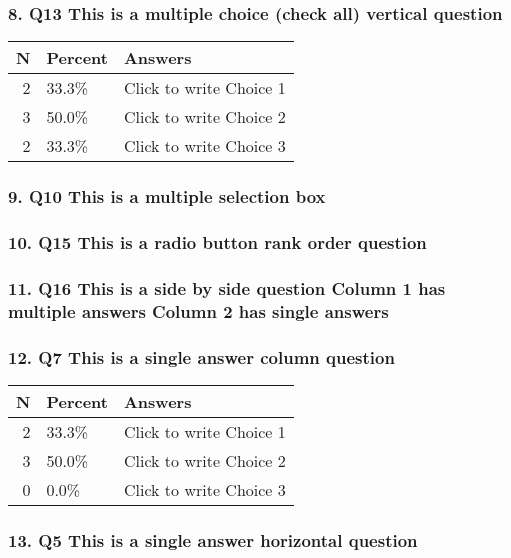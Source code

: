 \documentclass{article}\usepackage[]{graphicx}\usepackage[]{color}
\begin{document}
\hfill \break \hfill \break
\subsubsection*{8. Q13
This is a multiple choice (check all) vertical question}

\begin{tabular}{r|l|l}
\hline
N & Percent & Answers\\
\hline
2 & 33.3\% & Click to write Choice 1\\
\hline
3 & 50.0\% & Click to write Choice 2\\
\hline
2 & 33.3\% & Click to write Choice 3\\
\hline
\end{tabular}


\hfill \break \hfill \break
\subsubsection*{9. Q10
This is a multiple selection box}

\hfill \break \hfill \break
\subsubsection*{10. Q15
This is a radio button rank order question}

\hfill \break \hfill \break
\subsubsection*{11. Q16
This is a side by side question Column 1 has multiple answers Column 2 has single answers}

\hfill \break \hfill \break
\subsubsection*{12. Q7
This is a single answer column question}

\begin{tabular}{r|l|l}
\hline
N & Percent & Answers\\
\hline
2 & 33.3\% & Click to write Choice 1\\
\hline
3 & 50.0\% & Click to write Choice 2\\
\hline
0 & 0.0\% & Click to write Choice 3\\
\hline
\end{tabular}


\hfill \break \hfill \break
\subsubsection*{13. Q5
This is a single answer horizontal question}
\end{document}

